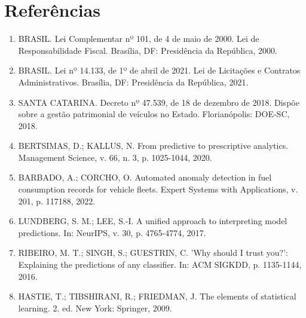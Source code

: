 \documentclass[11pt,a4paper]{article}
\begin{document}
\section*{Referências}
\begin{enumerate}
\item BRASIL. Lei Complementar nº 101, de 4 de maio de 2000. Lei de Responsabilidade Fiscal. Brasília, DF: Presidência da República, 2000.
\item BRASIL. Lei nº 14.133, de 1º de abril de 2021. Lei de Licitações e Contratos Administrativos. Brasília, DF: Presidência da República, 2021.
\item SANTA CATARINA. Decreto nº 47.539, de 18 de dezembro de 2018. Dispõe sobre a gestão patrimonial de veículos no Estado. Florianópolis: DOE-SC, 2018.
\item BERTSIMAS, D.; KALLUS, N. From predictive to prescriptive analytics. Management Science, v. 66, n. 3, p. 1025-1044, 2020.
\item BARBADO, A.; CORCHO, O. Automated anomaly detection in fuel consumption records for vehicle fleets. Expert Systems with Applications, v. 201, p. 117188, 2022.
\item LUNDBERG, S. M.; LEE, S.-I. A unified approach to interpreting model predictions. In: NeurIPS, v. 30, p. 4765-4774, 2017.
\item RIBEIRO, M. T.; SINGH, S.; GUESTRIN, C. 'Why should I trust you?': Explaining the predictions of any classifier. In: ACM SIGKDD, p. 1135-1144, 2016.
\item HASTIE, T.; TIBSHIRANI, R.; FRIEDMAN, J. The elements of statistical learning. 2. ed. New York: Springer, 2009.
\end{enumerate}
\end{document}
